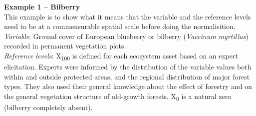 \documentclass[
  authoryear,
  preprint,
  3p]{elsarticle}
\begin{document}
\begin{tcolorbox}[enhanced jigsaw, colback=white, toprule=.15mm, breakable, opacityback=0, arc=.35mm, left=2mm, bottomrule=.15mm, leftrule=.75mm, colframe=quarto-callout-note-color-frame, rightrule=.15mm]

\textbf{Example 1 -- Bilberry}\\

This example is to show what it means that the variable and the
reference levels need to be at a commensurable spatial scale before
doing the normalisition.\\

\emph{Variable}: Ground cover of European blueberry or bilberry
(\emph{Vaccinum myrtillus}) recorded in permanent vegetation plots.\\

\emph{Reference levels}: X\textsubscript{100} is defined for each
ecosystem asset based on an expert elicitation. Experts were informed by
the distribution of the variable values both within and outside
protected areas, and the regional distribution of major forest types.
They also used their general knowledge about the effect of forestry and
on the general vegetation structure of old-growth forests.
X\textsubscript{0} is a natural zero (bilberry completely absent).\\

\begin{table}[H]

\caption{\label{tbl-bilberry}Dummy data for the bilberry example.
Variable values (\% cover of bilberry) are recorded for each vegetation
plot, and aggregated (arithmetic mean) to the ecosystem asset (EA)
level. The X\textsubscript{100} value is defined for the EA level, but
in this hypothetical case it is also dis-aggregated to each vegetation
plot and used for normalising variable values also at the plot level.
The dis-aggregated X\textsubscript{100} values, and subsequent values
that rely on these, are marked with an asterisk (*).}

\end{table}
\end{tcolorbox}
\end{document}
